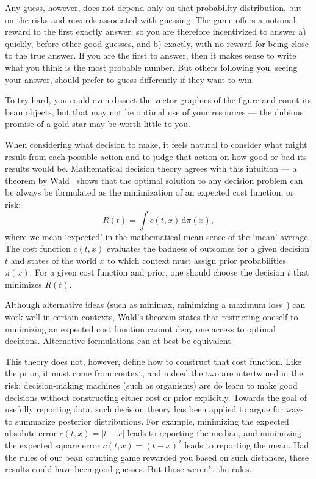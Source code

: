 Any guess, however, does not depend only on that probability distribution,
but on the risks and rewards associated with guessing.
The game offers a notional reward to the first exactly answer, so
you are therefore incentivized to answer a) quickly, before other good guesses,
and b) exactly, with no reward for being close to the true answer.
If you are the first to answer, then it makes sense to write what you think
is the most probable number.
But others following you, seeing your answer, should prefer to guess
differently if they want to win.

To try hard, you could even dissect the vector graphics of the figure and count
its bean objects, but that may not be optimal use of your resources --- the
dubious promise of a gold star may be worth little to you.

When considering what decision to make, it feels natural to consider what
might result from each possible action and to judge that action on how good or
bad its results would be.
Mathematical decision theory agrees with this intuition ---
a theorem by Wald~\cite{
wald1947bayes,
wald1950bayes,
jaynes2003probability
}
shows that the optimal solution to any decision problem can be always be
formulated as the minimization of an expected cost function, or risk:
\begin{equation}
\label{eqn:searches_bayes_decision_rule}
R(t) = \int\! c(t, x) \,\mathrm{d}\pi(x)
,
\end{equation}
where we mean `expected' in the mathematical mean sense of the `mean' average.
The cost function $c(t, x)$ evaluates the badness of outcomes for a given
decision $t$ and states of the world $x$ to which context must assign prior
probabilities $\pi(x)$.
For a given cost function and prior, one should choose the decision $t$ that
minimizes $R(t)$.

Although alternative ideas (such as minimax, minimizing a maximum
loss~\cite{savage1951review}) can work well in certain contexts,
Wald's theorem states that restricting oneself to minimizing an expected cost
function cannot deny one access to optimal decisions.
Alternative formulations can at best be equivalent.

This theory does not, however, define how to construct that cost function.
Like the prior, it must come from context, and indeed the two are intertwined
in the risk;
decision-making machines (such as organisms) are do learn to make good
decisions without constructing either cost or prior explicitly.
Towards the goal of usefully reporting data, such decision theory has been
applied to argue for ways to summarize posterior distributions.
For example, minimizing the expected absolute error
$c(t, x) = |t - x|$ leads
to reporting the median, and minimizing the expected square error
$c(t, x) = (t - x)^2$ leads to reporting the mean.
Had the rules of our bean counting game rewarded you based on such distances,
these results could have been good guesses.
But those weren't the rules.

